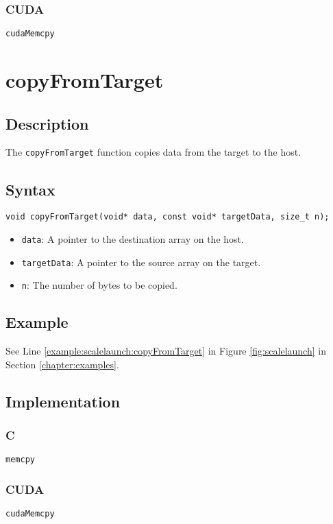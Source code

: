 \subsubsection{CUDA}
\verb+cudaMemcpy+

\newpage
\section{copyFromTarget}

\subsection{Description}

The \verb+copyFromTarget+ function copies data from the target to the host.

\subsection{Syntax}
\begin{verbatim}
void copyFromTarget(void* data, const void* targetData, size_t n);
\end{verbatim}

\begin{itemize}
\item \verb+data+: A pointer to the destination array on the host.
\item \verb+targetData+: A pointer to the source array on the target.
\item \verb+n+: The number of bytes to be copied.
\end{itemize}


\subsection{Example}
See Line \ref{example:scalelaunch:copyFromTarget} in Figure \ref{fig:scalelaunch} in Section \ref{chapter:examples}.

\subsection{Implementation}
\subsubsection{C}
\verb+memcpy+
\subsubsection{CUDA}
\verb+cudaMemcpy+



